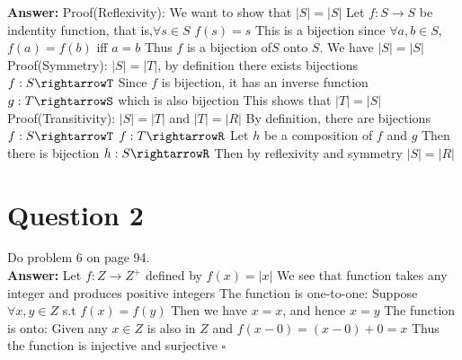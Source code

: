 \documentclass[12pt]{article}
\begin{document}
{\noindent\bf Answer:}
{
\newline
Proof(Reflexivity): We want to show that $\vert S\vert=\vert S\vert$\newline
Let $f:S \rightarrow S$ be indentity function, that is,$\forall s \in S$ $f(s)=s$\newline
This is a bijection since $\forall a,b \in S$,$f(a)=f(b)$ iff $a=b$\newline
Thus $f$ is a bijection of$ S$ onto $S$. We have $\vert S\vert=\vert S\vert$\newline
 \newline
Proof(Symmetry):
$\vert S\vert=\vert T\vert$, by definition there exists bijections $f:S\rightarrowT$\newline
Since $f$ is bijection, it has an inverse function $g:T\rightarrowS$ which is also bijection\newline
This shows that $\vert T\vert=\vert S\vert$\newline
 \newline
Proof(Transitivity):\newline
$\vert S\vert=\vert T\vert$ and $\vert T\vert=\vert R\vert$\newline
By definition, there are bijections $f:S\rightarrowT$ $f:T\rightarrowR$\newline
Let $h$ be a composition of $f$ and $g$\newline
Then there is bijection $h:S\rightarrowR$\newline
Then by reflexivity and symmetry $\vert S\vert=\vert R\vert$
}

\newpage
\section*{Question 2}

Do problem 6 on page 94.\\

{\noindent\bf Answer:}
{
 \newline
Let $f:Z \rightarrow Z^+$ defined by $f(x)=\vert x\vert$\newline
We see that function takes any integer and produces positive integers\newline
The function is one-to-one:\newline
Suppose $\forall x,y \in Z$ s.t $f(x)=f(y)$ \newline
Then we have $x=x$, and hence $x=y$\newline
The function is onto:\newline
Given any $x \in Z$ is also in $Z$ and $f(x-0)=(x-0)+0=x$\newline
Thus the function is injective and surjective $\square$
}
\end{document}
